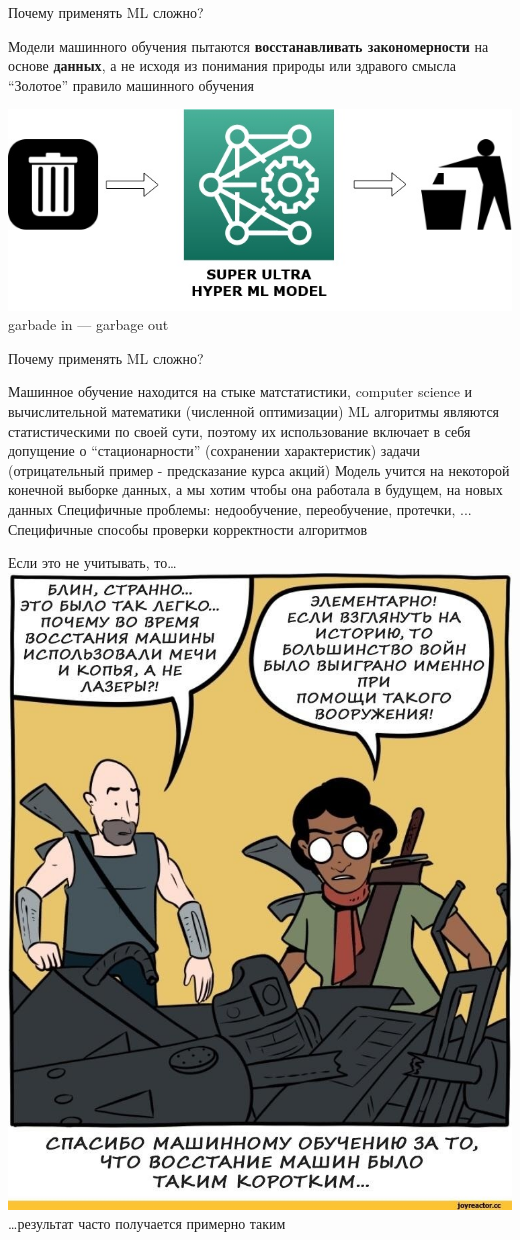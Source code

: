 \documentclass[aspectratio=169, professionalfonts]{beamer}
\begin{document}
\begin{frame}{Почему применять ML сложно?}
    \begin{outline}
        \1 Модели машинного обучения пытаются \textbf{восстанавливать закономерности} на
        основе \textbf{данных}, а не исходя из понимания природы или здравого смысла
        \1 ``Золотое'' правило машинного обучения
    \end{outline}
    \begin{center}
        \includegraphics[width=.49\linewidth]{figures/fig42-golden-rule.jpg} \\
        garbade in --- garbage out
    \end{center}
\end{frame}

\begin{frame}{Почему применять ML сложно?}
    \begin{outline}
        \1 Машинное обучение находится на стыке матстатистики, computer science и
        вычислительной математики (численной оптимизации)
        \pause
        \1 ML алгоритмы являются статистическими по своей сути, поэтому их использование
        включает в себя допущение о ``стационарности'' (сохранении характеристик)
        задачи (отрицательный пример - предсказание курса акций)
        \pause
        \1 Модель учится на некоторой конечной выборке данных, а мы хотим чтобы она
        работала в будущем, на новых данных
        \pause
        \1 Специфичные проблемы: недообучение, переобучение, протечки, ...
        \1 Специфичные способы проверки корректности алгоритмов
    \end{outline}
\end{frame}

\begin{frame}{Если это не учитывать, то\ldots}
    \centering
    \includegraphics[width=.345\linewidth]{figures/fig43-ml-fuckup.jpg} \\
    \ldots результат часто получается примерно таким
\end{frame}
\end{document}
